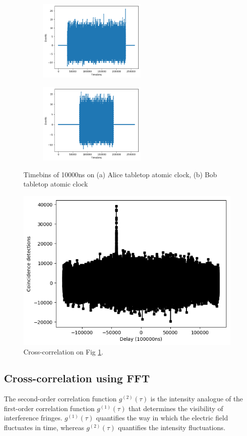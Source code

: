 \begin{figure}[ht!]
	\centering
	\begin{subfigure}[t]{0.49\linewidth}
		\centering
		\includegraphics[height=4cm]{assets/alice_bin.png}
		\subcaption{}
	\end{subfigure}
	\begin{subfigure}[t]{0.49\textwidth}
		\centering
		\includegraphics[height=4cm]{assets/bob_bin.png}
		\subcaption{}
	\end{subfigure}
	\caption{Timebins of 10000ns on (a) Alice tabletop atomic clock, (b) Bob tabletop atomic clock}
	\label{fig:timebins}
\end{figure}

\begin{figure}[ht!]
	\includegraphics[width=0.97\linewidth]{assets/cc}
	\caption{Cross-correlation on Fig \ref{fig:timebins}.}
	\label{fig:cc_bin}
\end{figure}

\subsection{Cross-correlation using FFT}

The second-order correlation function $g^{(2)}(\tau)$ is the intensity analogue of the first-order correlation function $g^{(1)}(\tau)$ that determines the visibility of interference fringes. $g^{(1)}(\tau)$ quantifies the way in which the electric field fluctuates in time, whereas $g^{(2)}(\tau)$ quantifies the intensity fluctuations.